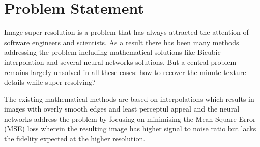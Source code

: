 \chapter{Problem Statement}
Image super resolution is a problem that has always attracted the attention of software engineers and scientists. As a result there has been many methods addressing the problem including mathematical solutions like Bicubic interpolation and several neural networks solutions. But a central problem remains largely unsolved in all these cases: how to recover the minute texture details while super resolving?

The existing mathematical methods are based on interpolations which results in images with overly smooth edges and least perceptul appeal and the neural networks address the problem by focusing on minimising the Mean Square Error (MSE) loss wherein the resulting image has higher signal to noise ratio but lacks the fidelity expected at the higher resolution.